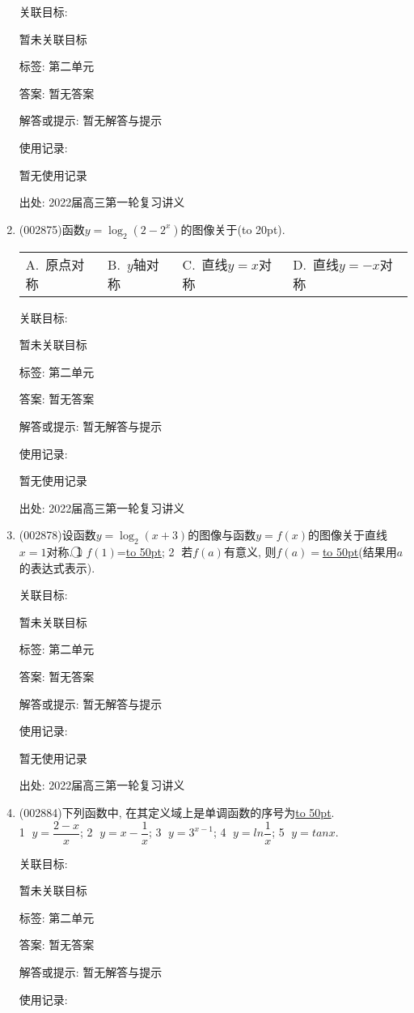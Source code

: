 \documentclass[10pt,a4paper]{article}
\newcommand{\blank}[1]{\underline{\hbox to #1pt{}}}
\newcommand{\bracket}[1]{(\hbox to #1pt{})}
\newcommand{\fourch}[4]{\par\begin{tabular}{p{.23\textwidth}p{.23\textwidth}p{.23\textwidth}p{.23\textwidth}}
A.~#1 &B.~#2& C.~#3& D.~#4
\end{tabular}}
\begin{document}
\begin{enumerate}[1.]
关联目标:

暂未关联目标



标签: 第二单元

答案: 暂无答案

解答或提示: 暂无解答与提示

使用记录:

暂无使用记录


出处: 2022届高三第一轮复习讲义
\item { (002875)}函数$y=\log_2(2-2^x)$的图像关于\bracket{20}.
\fourch{原点对称}{$y$轴对称}{直线$y=x$对称}{直线$y=-x$对称}


关联目标:

暂未关联目标



标签: 第二单元

答案: 暂无答案

解答或提示: 暂无解答与提示

使用记录:

暂无使用记录


出处: 2022届高三第一轮复习讲义
\item { (002878)}设函数$y=\log_2(x+3)$的图像与函数$y=f(x)$的图像关于直线$x=1$对称. \textcircled{1} $f(1)$=\blank{50}; \textcircled{2} 若$f(a)$有意义, 则$f(a)=$\blank{50}(结果用$a$的表达式表示).


关联目标:

暂未关联目标



标签: 第二单元

答案: 暂无答案

解答或提示: 暂无解答与提示

使用记录:

暂无使用记录


出处: 2022届高三第一轮复习讲义
\item { (002884)}下列函数中, 在其定义域上是单调函数的序号为\blank{50}.\\
\textcircled{1} $y=\dfrac{2-x}x$; \textcircled{2} $y=x-\dfrac 1x$; \textcircled{3} $y={3^{x-1}}$; \textcircled{4} $y=ln\dfrac 1x$; \textcircled{5} $y=tanx$.


关联目标:

暂未关联目标



标签: 第二单元

答案: 暂无答案

解答或提示: 暂无解答与提示

使用记录:


\end{enumerate}
\end{document}
